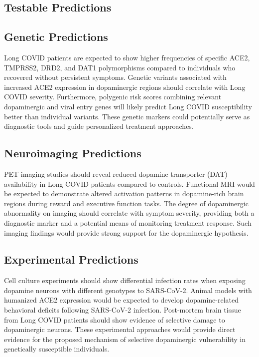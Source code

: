 \documentclass[11pt]{article}
\begin{document}
\begin{center}
\section*{Testable Predictions}
\end{center}

\subsection*{Genetic Predictions}
Long COVID patients are expected to show higher frequencies of specific ACE2, TMPRSS2, DRD2, and DAT1 polymorphisms compared to individuals who recovered without persistent symptoms. Genetic variants associated with increased ACE2 expression in dopaminergic regions should correlate with Long COVID severity. Furthermore, polygenic risk scores combining relevant dopaminergic and viral entry genes will likely predict Long COVID susceptibility better than individual variants. These genetic markers could potentially serve as diagnostic tools and guide personalized treatment approaches.

\subsection*{Neuroimaging Predictions}
PET imaging studies should reveal reduced dopamine transporter (DAT) availability in Long COVID patients compared to controls. Functional MRI would be expected to demonstrate altered activation patterns in dopamine-rich brain regions during reward and executive function tasks. The degree of dopaminergic abnormality on imaging should correlate with symptom severity, providing both a diagnostic marker and a potential means of monitoring treatment response. Such imaging findings would provide strong support for the dopaminergic hypothesis.

\subsection*{Experimental Predictions}
Cell culture experiments should show differential infection rates when exposing dopamine neurons with different genotypes to SARS-CoV-2. Animal models with humanized ACE2 expression would be expected to develop dopamine-related behavioral deficits following SARS-CoV-2 infection. Post-mortem brain tissue from Long COVID patients should show evidence of selective damage to dopaminergic neurons. These experimental approaches would provide direct evidence for the proposed mechanism of selective dopaminergic vulnerability in genetically susceptible individuals.
\end{document}

